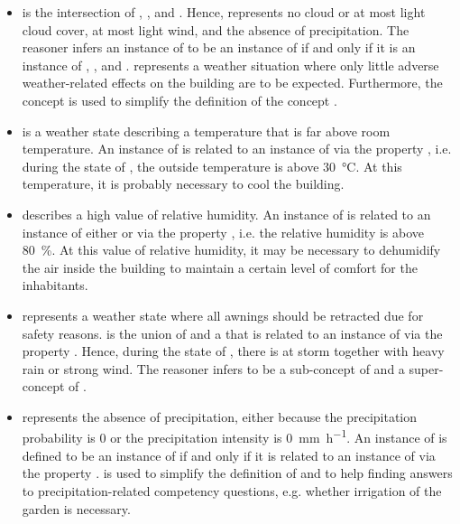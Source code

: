 \begin{itemize}
  \item {} is the intersection of , , and . Hence,  represents no cloud or at most light cloud cover, at most light wind, and the absence of precipitation. The  reasoner infers an instance of  to be an instance of  if and only if it is an instance of , , and .  represents a weather situation where only little adverse weather-related effects on the building are to be expected. Furthermore, the concept  is used to simplify the definition of the concept .
  
  \item {} is a weather state describing a temperature that is far above room temperature. An instance of  is related to an instance of  via the property , i.e. during the state of , the outside temperature is above \SI{30}{\celsius}. At this temperature, it is probably necessary to cool the building.
  
  \item {} describes a high value of relative humidity. An instance of  is related to an instance of either  or  via the property , i.e. the relative humidity is above \SI{80}{\percent}. At this value of relative humidity, it may be necessary to dehumidify the air inside the building to maintain a certain level of comfort for the inhabitants.
  
  \item {} represents a weather state where all awnings should be retracted due for safety reasons.  is the union of  and a  that is related to an instance of  via the property . Hence, during the state of , there is at storm together with heavy rain or strong wind. The  reasoner infers  to be a sub-concept of  and a super-concept of .
  
  \item {} represents the absence of precipitation, either because the precipitation probability is \num{0} or the precipitation intensity is \SI{0}{\milli\metre\per\hour}. An instance of  is defined to be an instance of  if and only if it is related to an instance of  via the property .  is used to simplify the definition of  and to help finding answers to precipitation-related competency questions, e.g. whether irrigation of the garden is necessary.
  

\end{itemize}
